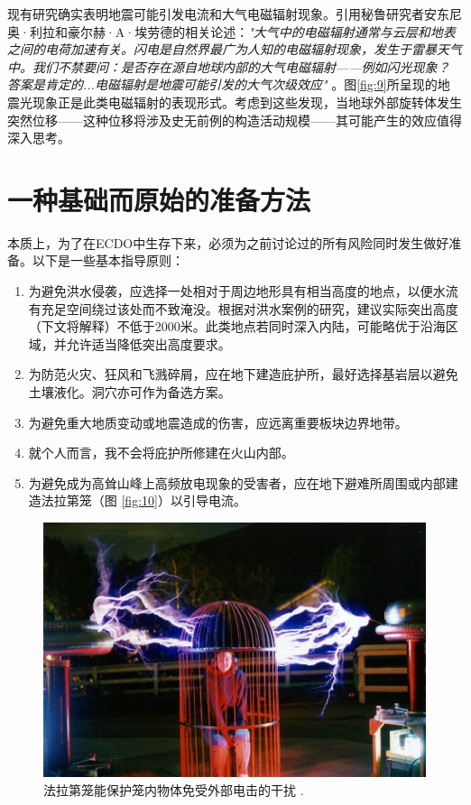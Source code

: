 \documentclass[10pt,twocolumn,letterpaper]{article}
\begin{document}
现有研究确实表明地震可能引发电流和大气电磁辐射现象\cite{49,50}。引用秘鲁研究者安东尼奥·利拉和豪尔赫·A·埃劳德的相关论述：\textit{"大气中的电磁辐射通常与云层和地表之间的电荷加速有关。闪电是自然界最广为人知的电磁辐射现象，发生于雷暴天气中。我们不禁要问：是否存在源自地球内部的大气电磁辐射——例如闪光现象？答案是肯定的...电磁辐射是地震可能引发的大气次级效应"} \cite{50}。图\ref{fig:9}所呈现的地震光现象正是此类电磁辐射的表现形式。考虑到这些发现，当地球外部旋转体发生突然位移——这种位移将涉及史无前例的构造活动规模——其可能产生的效应值得深入思考。
\section{一种基础而原始的准备方法}

本质上，为了在ECDO中生存下来，必须为之前讨论过的所有风险同时发生做好准备。以下是一些基本指导原则：

\begin{flushleft}
\begin{enumerate}
    \item 为避免洪水侵袭，应选择一处相对于周边地形具有相当高度的地点，以便水流有充足空间绕过该处而不致淹没。根据对洪水案例的研究，建议实际突出高度（下文将解释）不低于2000米。此类地点若同时深入内陆，可能略优于沿海区域，并允许适当降低突出高度要求。
    \item 为防范火灾、狂风和飞溅碎屑，应在地下建造庇护所，最好选择基岩层以避免土壤液化。洞穴亦可作为备选方案。
    \item 为避免重大地质变动或地震造成的伤害，应远离重要板块边界地带。
    \item 就个人而言，我不会将庇护所修建在火山内部。
    \item 为避免成为高耸山峰上高频放电现象的受害者，应在地下避难所周围或内部建造法拉第笼（图 \ref{fig:10}）以引导电流。
\end{enumerate}
\end{flushleft}

\begin{figure}[t]
\begin{center}
   \includegraphics[width=1\linewidth]{faraday.jpg}
\end{center}
   \caption{法拉第笼能保护笼内物体免受外部电击的干扰 \cite{54}.}
\label{fig:10}
\label{fig:onecol}
\end{figure}
\end{document}
